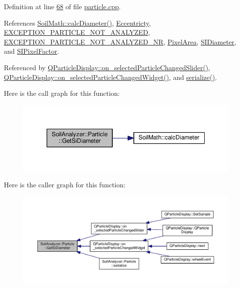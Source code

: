 Definition at line \hyperlink{particle_8cpp_source_l00068}{68} of file \hyperlink{particle_8cpp_source}{particle.\+cpp}.



References \hyperlink{_common_operations_8h_source_l00115}{Soil\+Math\+::calc\+Diameter()}, \hyperlink{particle_8h_source_l00053}{Eccentricty}, \hyperlink{soilanalyzerexception_8h_source_l00007}{E\+X\+C\+E\+P\+T\+I\+O\+N\+\_\+\+P\+A\+R\+T\+I\+C\+L\+E\+\_\+\+N\+O\+T\+\_\+\+A\+N\+A\+L\+Y\+Z\+E\+D}, \hyperlink{soilanalyzerexception_8h_source_l00008}{E\+X\+C\+E\+P\+T\+I\+O\+N\+\_\+\+P\+A\+R\+T\+I\+C\+L\+E\+\_\+\+N\+O\+T\+\_\+\+A\+N\+A\+L\+Y\+Z\+E\+D\+\_\+\+N\+R}, \hyperlink{particle_8h_source_l00052}{Pixel\+Area}, \hyperlink{particle_8h_source_l00073}{S\+I\+Diameter}, and \hyperlink{particle_8h_source_l00051}{S\+I\+Pixel\+Factor}.



Referenced by \hyperlink{qparticledisplay_8cpp_source_l00124}{Q\+Particle\+Display\+::on\+\_\+selected\+Particle\+Changed\+Slider()}, \hyperlink{qparticledisplay_8cpp_source_l00110}{Q\+Particle\+Display\+::on\+\_\+selected\+Particle\+Changed\+Widget()}, and \hyperlink{particle_8h_source_l00083}{serialize()}.



Here is the call graph for this function\+:
\nopagebreak
\begin{figure}[H]
\begin{center}
\leavevmode
\includegraphics[width=345pt]{class_soil_analyzer_1_1_particle_aacde58abc866af8873c73044db80820b_cgraph}
\end{center}
\end{figure}




Here is the caller graph for this function\+:
\nopagebreak
\begin{figure}[H]
\begin{center}
\leavevmode
\includegraphics[width=350pt]{class_soil_analyzer_1_1_particle_aacde58abc866af8873c73044db80820b_icgraph}
\end{center}
\end{figure}


